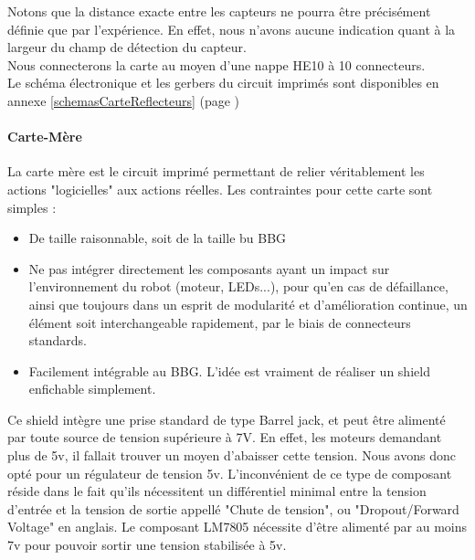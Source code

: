 
			Notons que la distance exacte entre les capteurs ne pourra être précisément définie que par l'expérience. En effet, nous n'avons aucune indication quant à la largeur du champ de détection du capteur.\\

			Nous connecterons la carte au moyen d'une nappe HE10 à 10 connecteurs.\\

			Le schéma électronique et les gerbers du circuit imprimés sont disponibles en annexe \ref{schemasCarteReflecteurs} (page \pageref{schemasCarteReflecteurs})

		\paragraph{Carte-Mère}\label{carteMere}

			La carte mère est le circuit imprimé permettant de relier véritablement les actions "logicielles" aux actions réelles. Les contraintes pour cette carte sont simples :
			\begin{itemize}
				\item De taille raisonnable, soit de la taille bu BBG
				\item Ne pas intégrer directement les composants ayant un impact sur l'environnement du robot (moteur, LEDs...), pour qu'en cas de défaillance, ainsi que toujours dans un esprit de modularité et d'amélioration continue, un élément soit interchangeable rapidement, par le biais de connecteurs standards.
				\item Facilement intégrable au BBG. L'idée est vraiment de réaliser un shield enfichable simplement.
			\end{itemize}
			

			Ce shield intègre une prise standard de type Barrel jack, et peut être alimenté par toute source de tension supérieure à 7V. 
			En effet, les moteurs demandant plus de 5v, il fallait trouver un moyen d'abaisser cette tension. Nous avons donc opté pour un régulateur de tension 5v. L'inconvénient de ce type de composant réside dans le fait qu'ils nécessitent un différentiel minimal entre la tension d'entrée et la tension de sortie appellé "Chute de tension", ou "Dropout/Forward Voltage" en anglais. Le composant LM7805 nécessite d'être alimenté par au moins 7v \cite{bib21} pour pouvoir sortir une tension stabilisée à 5v.\\

